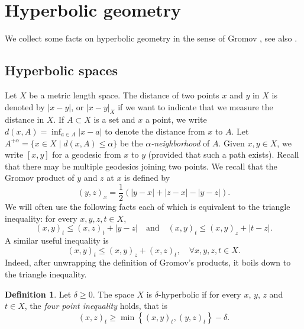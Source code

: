 \documentclass[11pt]{article}
\theoremstyle{plain}
\theoremstyle{definition}
\newtheorem{df}[thm]{Definition}
\begin{document}
\section{Hyperbolic geometry}

We collect some facts on hyperbolic geometry in the sense of Gromov \cite{gromov_hyperbolic_1987}, see also \cite{coornaert_geometry_1990,ghys_hyperboliques_1990}.

\subsection{Hyperbolic spaces}
\label{sec: Hyperbolic spaces}

Let $X$ be a metric length space. The distance of two points $x$ and $y$ in $X$ is denoted by $|x-y|$, or $|x-y|_X$ if we want to indicate that we measure the distance in $X$. If $A\subset X$ is a set and $x$ a point, we write $d(x,A)=\inf_{a\in A}|x-a|$ to denote the distance from $x$ to $A$.
Let $A^{+\alpha}=\{x\in X\mid d(x,A) \leqslant \alpha\}$ be the \emph{$\alpha$-neighborhood} of $A$.
Given $x, y \in X$, we write $[x,y]$ for a geodesic from $x$ to $y$ (provided that such a path exists).
Recall that there may be multiple geodesics joining two points.
We recall that the Gromov product of $y$ and $z$ at $x$ is defined by
\[
(y,z)_x=\frac{1}{2}\left( |y-x| + |z-x| - |y-z|\right).
\]
We will often use the following facts each of which is equivalent to the triangle inequality: for every $x,y,z,t \in X$,
\begin{equation*}
(x,y)_t \leq (x,z)_t + |y - z|
\quad \text{and} \quad
(x,y)_t \leq (x,y)_z + |t-z|.
\end{equation*}
A similar useful inequality is
\begin{equation}
\label{eqn: triangle inequality gromov product}
(x,y)_t \leq (x,y)_z + (x,z)_t, \quad \forall x,y,z,t \in X.
\end{equation}
Indeed, after unwrapping the definition of Gromov's products, it boils down to the triangle inequality.

\begin{df}
Let $\delta\geqslant 0$. The space $X$ is $\delta$-hyperbolic if for every $x$, $y$, $z$ and $t\in X$, the \emph{four point inequality} holds, that is
\begin{equation}
\label{eqn: four point inequality}
(x,z)_t\geqslant \min \left\{ (x,y)_t,(y,z)_t\right\}- \delta.
\end{equation}
\end{df}
\end{document}
